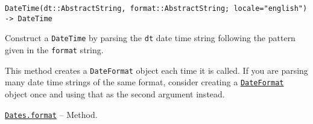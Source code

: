 \begin{adjustwidth}{2em}{0pt}


\begin{verbatim}
DateTime(dt::AbstractString, format::AbstractString; locale="english") -> DateTime
\end{verbatim}

Construct a \texttt{DateTime} by parsing the \texttt{dt} date time string following the pattern given in the \texttt{format} string.

This method creates a \texttt{DateFormat} object each time it is called. If you are parsing many date time strings of the same format, consider creating a \hyperlink{18093459443158853001}{\texttt{DateFormat}} object once and using that as the second argument instead.



\end{adjustwidth}
\hypertarget{16940765638871841169}{} 
\hyperlink{16940765638871841169}{\texttt{Dates.format}}  -- {Method.}

